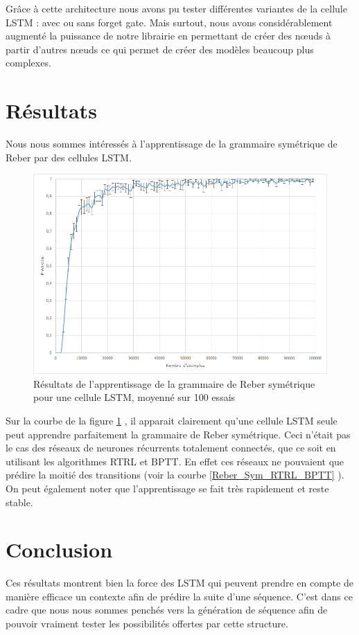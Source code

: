 Grâce à cette architecture nous avons pu tester différentes variantes de la cellule LSTM : avec ou sans forget gate. Mais surtout, nous avons considérablement augmenté la puissance de notre librairie en permettant de créer des n\oe{}uds à partir d'autres n\oe{}uds ce qui permet de créer des modèles beaucoup plus complexes.

\section{Résultats}

Nous nous sommes intéressés à l'apprentissage de la grammaire symétrique de Reber par des cellules LSTM. 

\begin{figure}[h!]
\begin{center}
\includegraphics[scale=0.5]{images/chapter6/LSTM_Reber_Sym.png}
\caption{Résultats de l'apprentissage de la grammaire de Reber symétrique pour une cellule LSTM, moyenné sur 100 essais}
\label{Reber_Sym_LSTM}
\end{center}
\end{figure}

Sur la courbe de la figure \ref{Reber_Sym_LSTM} , il apparait clairement qu'une cellule LSTM seule peut apprendre parfaitement la grammaire de Reber symétrique. Ceci n'était pas le cas des réseaux de neurones récurrents totalement connectés, que ce soit en utilisant les algorithmes RTRL et BPTT. En effet ces réseaux ne pouvaient que prédire la moitié des transitions (voir la courbe \ref{Reber_Sym_RTRL_BPTT} ).
On peut également noter que l'apprentissage se fait très rapidement et reste stable. 

\section{Conclusion}
Ces résultats montrent bien la force des LSTM qui peuvent prendre en compte de manière efficace un contexte afin de prédire la suite d'une séquence. C'est dans ce cadre que nous nous sommes penchés vers la génération de séquence afin de pouvoir vraiment tester les possibilités offertes par cette structure.